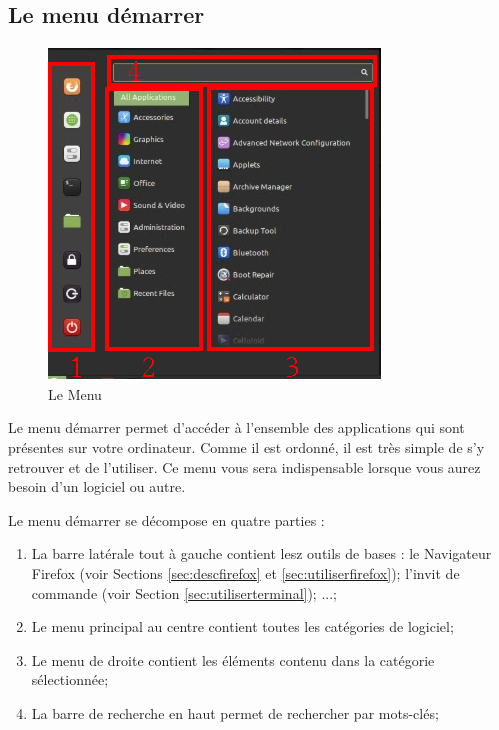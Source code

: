 \documentclass[12pt]{book}
\begin{document}
	\subsection{Le menu démarrer}\label{sec:menu}
		\begin{figure}[h]
			\centering
			\includegraphics[width=.4\textwidth]{include/menu.png}\newline
			\caption{Le Menu}
			\label{fig:menu}
		\end{figure}\par
		Le menu démarrer permet d'accéder à l'ensemble des applications qui sont présentes sur votre ordinateur.
		Comme il est ordonné, il est très simple de s'y retrouver et de l'utiliser.
		Ce menu vous sera indispensable lorsque vous aurez besoin d'un logiciel ou autre.\par
		Le menu démarrer se décompose en quatre parties :
		\begin{enumerate}
			\item La barre latérale tout à gauche contient lesz outils de bases : le Navigateur Firefox (voir Sections \ref{sec:descfirefox} et \ref{sec:utiliserfirefox}); l'invit de commande (voir Section \ref{sec:utiliserterminal}); ...;
			\item Le menu principal au centre contient toutes les catégories de logiciel;
			\item Le menu de droite contient les éléments contenu dans la catégorie sélectionnée;
			\item La barre de recherche en haut permet de rechercher par mots-clés;
		\end{enumerate}
\end{document}
